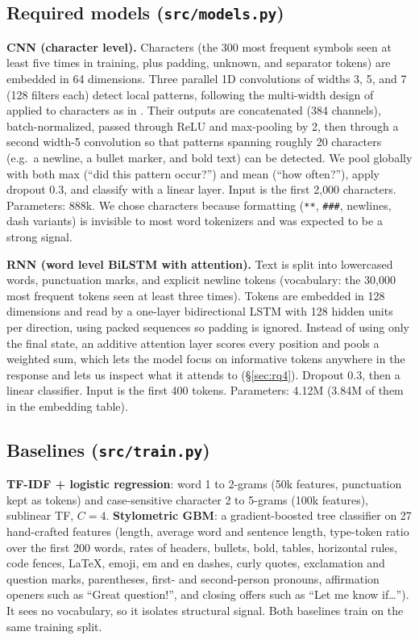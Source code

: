 \documentclass[11pt]{article}
\begin{document}
\subsection{Required models (\texttt{src/models.py})}
\textbf{CNN (character level).} Characters (the 300 most frequent symbols seen at least five times in training, plus padding, unknown, and separator tokens) are embedded in 64 dimensions. Three parallel 1D convolutions of widths 3, 5, and 7 (128 filters each) detect local patterns, following the multi-width design of \cite{kim2014cnn} applied to characters as in \cite{zhang2015charcnn}. Their outputs are concatenated (384 channels), batch-normalized, passed through ReLU and max-pooling by 2, then through a second width-5 convolution so that patterns spanning roughly 20 characters (e.g.\ a newline, a bullet marker, and bold text) can be detected. We pool globally with both max (``did this pattern occur?'') and mean (``how often?''), apply dropout 0.3, and classify with a linear layer. Input is the first 2{,}000 characters. Parameters: 888k. We chose characters because formatting (\texttt{**}, \texttt{\#\#\#}, newlines, dash variants) is invisible to most word tokenizers and was expected to be a strong signal.

\textbf{RNN (word level BiLSTM with attention).} Text is split into lowercased words, punctuation marks, and explicit newline tokens (vocabulary: the 30{,}000 most frequent tokens seen at least three times). Tokens are embedded in 128 dimensions and read by a one-layer bidirectional LSTM \cite{hochreiter1997lstm} with 128 hidden units per direction, using packed sequences so padding is ignored. Instead of using only the final state, an additive attention layer \cite{bahdanau2015attention} scores every position and pools a weighted sum, which lets the model focus on informative tokens anywhere in the response and lets us inspect what it attends to (\S\ref{sec:rq4}). Dropout 0.3, then a linear classifier. Input is the first 400 tokens. Parameters: 4.12M (3.84M of them in the embedding table).

\subsection{Baselines (\texttt{src/train.py})}
\textbf{TF-IDF + logistic regression}: word 1 to 2-grams (50k features, punctuation kept as tokens) and case-sensitive character 2 to 5-grams (100k features), sublinear TF, $C = 4$. \textbf{Stylometric GBM}: a gradient-boosted tree classifier on 27 hand-crafted features (length, average word and sentence length, type-token ratio over the first 200 words, rates of headers, bullets, bold, tables, horizontal rules, code fences, LaTeX, emoji, em and en dashes, curly quotes, exclamation and question marks, parentheses, first- and second-person pronouns, affirmation openers such as ``Great question!'', and closing offers such as ``Let me know if\ldots''). It sees no vocabulary, so it isolates structural signal. Both baselines train on the same training split.
\end{document}
